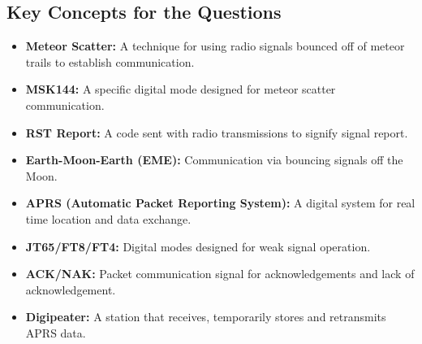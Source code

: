 \subsection*{Key Concepts for the Questions}
\begin{itemize}
    \item \textbf{Meteor Scatter:} A technique for using radio signals bounced off of meteor trails to establish communication.
     \item \textbf{MSK144:} A specific digital mode designed for meteor scatter communication.
     \item \textbf{RST Report:} A code sent with radio transmissions to signify signal report.
    \item \textbf{Earth-Moon-Earth (EME):} Communication via bouncing signals off the Moon.
    \item \textbf{APRS (Automatic Packet Reporting System):} A digital system for real time location and data exchange.
    \item \textbf{JT65/FT8/FT4:} Digital modes designed for weak signal operation.
    \item  \textbf{ACK/NAK:} Packet communication signal for acknowledgements and lack of acknowledgement.
     \item \textbf{Digipeater:} A station that receives, temporarily stores and retransmits APRS data.
\end{itemize}

